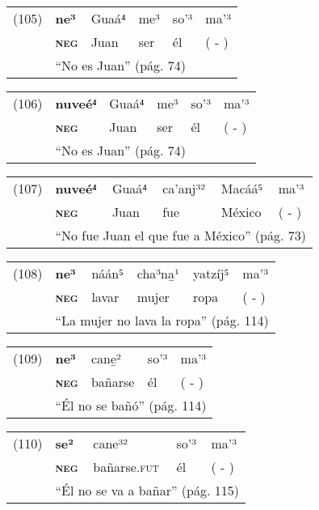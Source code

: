 {\setmainfont{Charis SIL} 

\begin{tabular}{llllll}
(105) & \textbf{ne³} & Guaá⁴ & me³ & so'³ & ma'³ \\
& \textsc{\textbf{neg}} & Juan & ser & él & ( - ) \\
& \multicolumn{5}{l}{``No es Juan'' (pág. 74)}
\end{tabular} \vspace{0.3cm}

\begin{tabular}{llllll}
(106) & \textbf{nuveé⁴} & Guaá⁴ & me³ & so'³ & ma'³ \\
& \textsc{\textbf{neg}} & Juan & ser & él & ( - ) \\
& \multicolumn{5}{l}{``No es Juan'' (pág. 74)}
\end{tabular} \vspace{0.3cm}

\begin{tabular}{llllll}
(107) & \textbf{nuveé⁴} & Guaá⁴ & ca'anj³² & Macáá⁵ & ma'³ \\
& \textsc{\textbf{neg}} & Juan & fue & México & ( - ) \\
& \multicolumn{5}{l}{``No fue Juan el que fue a México'' (pág. 73)} 
\end{tabular} \vspace{0.3cm}

\begin{tabular}{llllll}
(108) & \textbf{ne³} & náán⁵ & cha³na̱¹ & yatzíj⁵ & ma'³ \\
& \textsc{\textbf{neg}} & lavar & mujer &  ropa & ( - ) \\
& \multicolumn{5}{l}{``La mujer no lava la ropa'' (pág. 114)}
\end{tabular} \vspace{0.3cm}

\begin{tabular}{lllll}
(109) & \textbf{ne³} & cane̱² & so'³ & ma'³ \\
& \textsc{\textbf{neg}} & bañarse & él & ( - ) \\
& \multicolumn{4}{l}{``Él no se bañó'' (pág. 114)}
\end{tabular} \vspace{0.3cm}

\begin{tabular}{lllll}
(110) & \textbf{se²} & cane³² & so'³ & ma'³ \\
& \textsc{\textbf{neg}} & bañarse.\textsc{fut} & él & ( - ) \\
& \multicolumn{4}{l}{``Él no se va a bañar'' (pág. 115)}
\end{tabular} \vspace{0.3cm}

}

